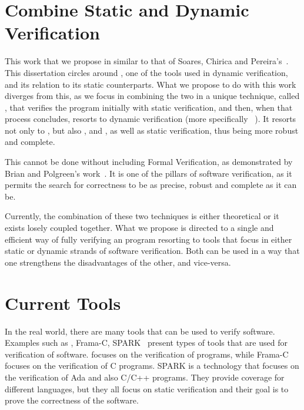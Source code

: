 \section{Combine Static and Dynamic Verification}
\label{sec:combine_static_and_dynamic_verification}

This work that we propose in similar to that of Soares, Chirica and Pereira's~\cite{Soares_Chirica_Pereira2024}. 
This dissertation circles around \gospellang, one of the tools used in 
dynamic verification, and its relation to its static counterparts. What we propose to do with this work 
diverges from this, as we focus in combining the two in a unique technique, called \monitors, that 
verifies the program initially with static verification, and then, when that process concludes, resorts to 
dynamic verification (more specifically \rac~\cite{Soares_Chirica_Pereira2024}). It resorts not only to 
\gospellang, but also \ortac, \why and \cameleer, as well as static verification, thus being more robust and 
complete.

This cannot be done without including Formal Verification, as demonstrated by Brian and Polgreen's 
work~\cite{Brian_Polgreen2025}. It is one of the pillars of software verification, as it permits the search for correctness 
to be as precise, robust and complete as it can be.

Currently, the combination of these two techniques is either theoretical or it exists losely coupled together. 
What we propose is directed to a single and efficient way of fully verifying an \ocaml program resorting to 
tools that focus in either static or dynamic strands of software verification. Both can be used in a way that 
one strengthens the disadvantages of the other, and vice-versa.

\section{Current Tools}
\label{sec:current_tools}

In the real world, there are many tools that can be used to verify software. 
Examples such as \why, Frama-C, SPARK~\cite{Kosmatov2014} present types of tools that are used 
for verification of software. \why focuses on the verification of \ocaml programs, while Frama-C 
focuses on the verification of C programs. SPARK is a technology that focuses on the verification 
of Ada and also C/C++ programs. They provide coverage for different languages, but they all 
focus on static verification and their goal is to prove the correctness of the software.

